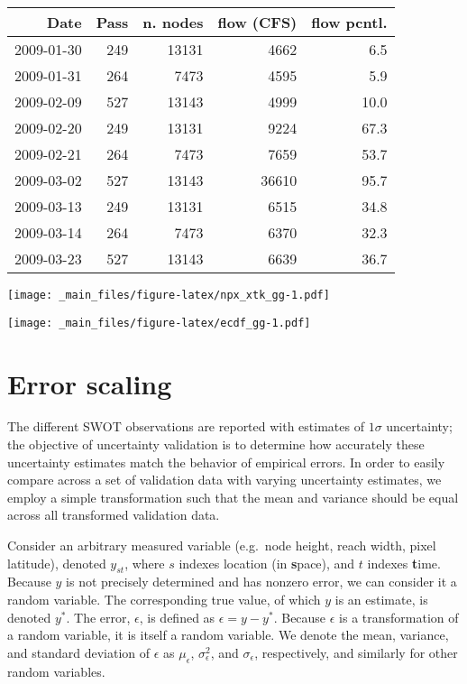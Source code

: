 \documentclass[]{book}
\begin{document}
\begin{tabular}{r|r|r|r|r}
\hline
Date & Pass & n. nodes & flow (CFS) & flow pcntl.\\
\hline
2009-01-30 & 249 & 13131 & 4662 & 6.5\\
\hline
2009-01-31 & 264 & 7473 & 4595 & 5.9\\
\hline
2009-02-09 & 527 & 13143 & 4999 & 10.0\\
\hline
2009-02-20 & 249 & 13131 & 9224 & 67.3\\
\hline
2009-02-21 & 264 & 7473 & 7659 & 53.7\\
\hline
2009-03-02 & 527 & 13143 & 36610 & 95.7\\
\hline
2009-03-13 & 249 & 13131 & 6515 & 34.8\\
\hline
2009-03-14 & 264 & 7473 & 6370 & 32.3\\
\hline
2009-03-23 & 527 & 13143 & 6639 & 36.7\\
\hline
\end{tabular}

\texttt{[image: \_main\_files/figure-latex/npx\_xtk\_gg-1.pdf]}

\texttt{[image: \_main\_files/figure-latex/ecdf\_gg-1.pdf]}

\hypertarget{error-scaling}{%
\section{Error scaling}\label{error-scaling}}

The different SWOT observations are reported with estimates of \(1 \sigma\) uncertainty; the objective of uncertainty validation is to determine how accurately these uncertainty estimates match the behavior of empirical errors. In order to easily compare across a set of validation data with varying uncertainty estimates, we employ a simple transformation such that the mean and variance should be equal across all transformed validation data.

Consider an arbitrary measured variable (e.g.~node height, reach width, pixel latitude), denoted \(y_{st}\), where \(s\) indexes location (in \textbf{s}pace), and \(t\) indexes \textbf{t}ime. Because \(y\) is not precisely determined and has nonzero error, we can consider it a random variable. The corresponding true value, of which \(y\) is an estimate, is denoted \(y^*\). The error, \(\epsilon\), is defined as \(\epsilon = y - y^*\). Because \(\epsilon\) is a transformation of a random variable, it is itself a random variable. We denote the mean, variance, and standard deviation of \(\epsilon\) as \(\mu_\epsilon\), \(\sigma^2_\epsilon\), and \(\sigma_\epsilon\), respectively, and similarly for other random variables.
\end{document}
